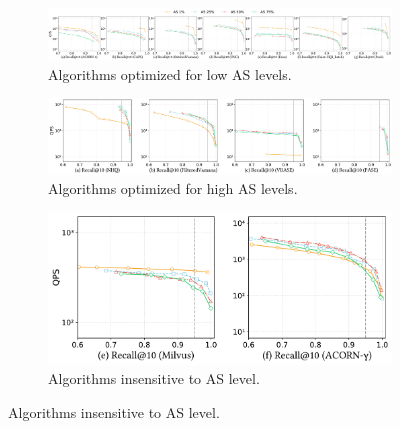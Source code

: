 \documentclass[sigconf, nonacm]{acmart}
\begin{document}
\begin{sloppypar}
\begin{figure}
    \centering
    
    \begin{subfigure}{\textwidth}
        \centering
        \setlength{\abovecaptionskip}{0cm}
        \setlength{\belowcaptionskip}{0cm}
        \includegraphics[width=\textwidth]{figures/exp/exp_5_2_1.pdf}
        \caption{Algorithms optimized for low AS levels.}
        \label{fig:exp_5_2_1}
    \end{subfigure}
    
    \vfill %

    \begin{subfigure}{0.66\textwidth} %
        \centering
        \setlength{\abovecaptionskip}{0cm}
        \setlength{\belowcaptionskip}{0cm}
        \includegraphics[width=\textwidth]{figures/exp/exp_5_2_2.pdf}
        \caption{Algorithms optimized for high AS levels.}
        \label{fig:exp_5_2_2}
    \end{subfigure}
    \hfill %
    \begin{subfigure}{0.33\textwidth} %
        \centering
        \setlength{\abovecaptionskip}{0cm}
        \setlength{\belowcaptionskip}{0cm}
        \includegraphics[width=\textwidth]{figures/exp/exp_5_2_3.pdf}
        \caption{Algorithms insensitive to AS level.}
        \label{fig:exp_5_2_3}
    \end{subfigure}
    

\end{figure}
\end{sloppypar}
\end{document}
